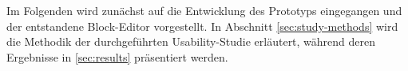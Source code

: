 \label{sec:study}
Im Folgenden wird zunächst auf die Entwicklung des Prototyps eingegangen und der entstandene Block-Editor vorgestellt. In Abschnitt \ref{sec:study-methods} wird die Methodik der durchgeführten Usability-Studie erläutert, während deren Ergebnisse in \ref{sec:results} präsentiert werden.
